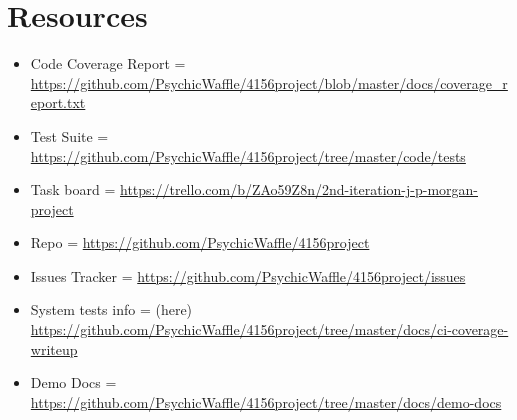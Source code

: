 \documentclass{article}
\begin{document}
\section{Resources}
\begin{itemize}
\item Code Coverage Report = \url{https://github.com/PsychicWaffle/4156project/blob/master/docs/coverage_report.txt}
\item Test Suite = \url{https://github.com/PsychicWaffle/4156project/tree/master/code/tests}
\item Task board = \url{https://trello.com/b/ZAo59Z8n/2nd-iteration-j-p-morgan-project}
\item Repo = \url{https://github.com/PsychicWaffle/4156project}
\item Issues Tracker = \url{https://github.com/PsychicWaffle/4156project/issues}
\item System tests info = (here) \url{https://github.com/PsychicWaffle/4156project/tree/master/docs/ci-coverage-writeup}
\item Demo Docs = \url{https://github.com/PsychicWaffle/4156project/tree/master/docs/demo-docs}
\end{itemize}
\end{document}
